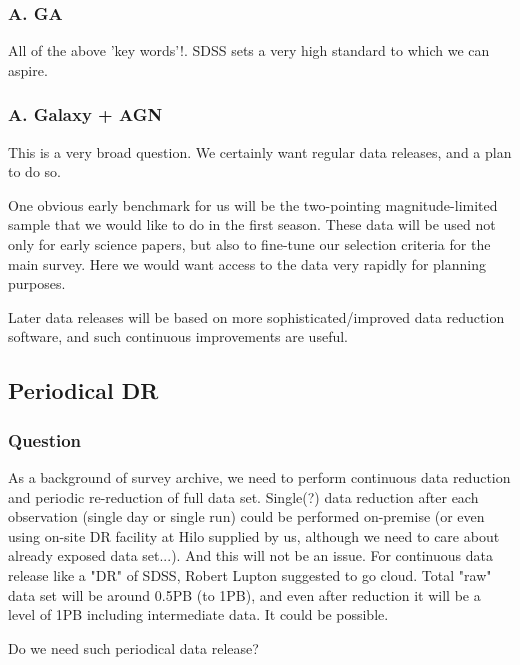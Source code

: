 \documentclass[a4paper,notitlepage]{article}
\begin{document}
\subsubsection{A. GA}
All of the above 'key words'!. SDSS sets a very high standard to
which we can aspire.

\subsubsection{A. Galaxy + AGN}
This is a very broad question. We certainly want regular data releases, 
and a plan to do so.

One obvious early benchmark for us will be the two-pointing 
magnitude-limited sample that we would like to do in the first 
season.  These data will be used not only for early science 
papers, but also to fine-tune our selection criteria for the main 
survey.  Here we would want access to the data very rapidly for 
planning purposes.

Later data releases will be based on more sophisticated/improved 
data reduction software, and such continuous improvements are useful.



\renewcommand{\thesubsection}{Q.7.0-\alph{subsection}}
\setcounter{subsection}{0}
\subsection{Periodical DR}

\subsubsection{Question}
As a background of survey archive, we need to perform continuous data
reduction and periodic re-reduction of full data set.  Single(?) data
reduction after each observation (single day or single run) could be
performed on-premise (or even using on-site DR facility at Hilo supplied
by us, although we need to care about already exposed data set...).  And
this will not be an issue. For continuous data release like a "DR" of
SDSS, Robert Lupton suggested to go cloud. Total "raw" data set will be
around 0.5PB (to 1PB), and even after reduction it will be a level of
1PB including intermediate data.  It could be possible.

Do we need such periodical data release?
\end{document}

